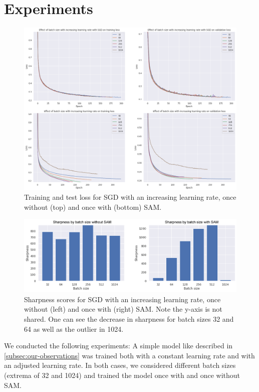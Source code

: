 \documentclass[10pt,conference,compsocconf]{IEEEtran}
\begin{document}
\section{Experiments}
\begin{figure}[tbp]
  \centering
  \includegraphics[width=\columnwidth]{img/figure1_val_loss_with_without_sam_sgd}
  \caption{Training and test loss for SGD with an increasing learning rate, once without (top) and once with (bottom) SAM.}
  \vspace{-3mm}
  \label{fig:val-loss-with-without}
\end{figure}
\begin{figure}[tbp]
  \centering
  \includegraphics[width=\columnwidth]{img/figure2_sharpness_with_without_sam_sgd}
  \caption{Sharpness scores for SGD with an increasing learning rate, once without (left) and once with (right) SAM. Note the y-axis is not shared. One can see the decrease in sharpness for batch sizes 32 and 64 as well as the outlier in 1024.}
  \vspace{-3mm}
  \label{fig:sharpness-with-without}
\end{figure}
We conducted the following experiments: A simple model like described in \ref{subsec:our-observations} was trained both with a constant learning rate and with an adjusted learning rate. In both cases, we considered different batch sizes (extrema of 32 and 1024) and trained the model once with and once without SAM.
\end{document}

